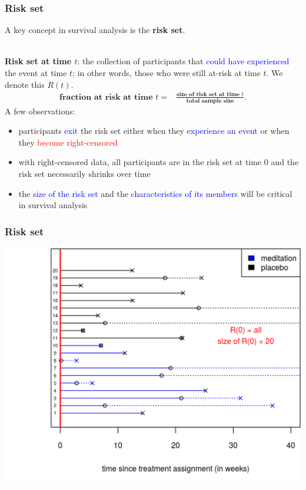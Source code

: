 \documentclass[10pt,t]{beamer}
\begin{document}
\begin{frame}
\frametitle{Risk set}
A key concept in survival analysis is the \textbf{risk set}.
\\ ~\ 

\textbf{Risk set at time $t$}: the collection of participants that \textcolor{blue}{could have experienced} the event at time $t$; in other words, those who were still at-risk at time $t$. We denote this $R(t)$. 
\begin{align*}
\textbf{fraction at risk at time } t = & \frac{\textbf{size of risk set at time } t}{\textbf{total sample size}}.
\end{align*}
A few observations:
\begin{itemize}
\item participants \textcolor{blue}{exit} the risk set either when they \textcolor{blue}{experience an event} or when they \textcolor{red}{become right-censored}
\item with right-censored data, all participants are in the risk set at time 0 and the risk set necessarily shrinks over time
\item the \textcolor{blue}{size of the risk set} and the \textcolor{blue}{characteristics of its members} will be critical in survival analysis
\end{itemize}
\end{frame}

\begin{frame}
\frametitle{Risk set}
\begin{center}
\includegraphics[height=0.8\textheight]{figs/risk_set_movie_0.png}
\end{center}
\end{frame}
\end{document}
